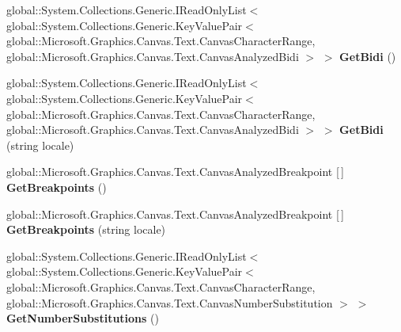 \begin{DoxyCompactItemize}
\mbox{\label{interface_microsoft_1_1_graphics_1_1_canvas_1_1_text_1_1_i_canvas_text_analyzer_ab5391603e9550535647efdab365121e0}} 
global\+::\+System.\+Collections.\+Generic.\+I\+Read\+Only\+List$<$ global\+::\+System.\+Collections.\+Generic.\+Key\+Value\+Pair$<$ global\+::\+Microsoft.\+Graphics.\+Canvas.\+Text.\+Canvas\+Character\+Range, global\+::\+Microsoft.\+Graphics.\+Canvas.\+Text.\+Canvas\+Analyzed\+Bidi $>$ $>$ {\bfseries Get\+Bidi} ()
\item 
\mbox{\label{interface_microsoft_1_1_graphics_1_1_canvas_1_1_text_1_1_i_canvas_text_analyzer_a00b2a6c66d95fcf0eb8cb93429692433}} 
global\+::\+System.\+Collections.\+Generic.\+I\+Read\+Only\+List$<$ global\+::\+System.\+Collections.\+Generic.\+Key\+Value\+Pair$<$ global\+::\+Microsoft.\+Graphics.\+Canvas.\+Text.\+Canvas\+Character\+Range, global\+::\+Microsoft.\+Graphics.\+Canvas.\+Text.\+Canvas\+Analyzed\+Bidi $>$ $>$ {\bfseries Get\+Bidi} (string locale)
\item 
\mbox{\label{interface_microsoft_1_1_graphics_1_1_canvas_1_1_text_1_1_i_canvas_text_analyzer_aae3059f7ac90b34a23ffa7061184bf59}} 
global\+::\+Microsoft.\+Graphics.\+Canvas.\+Text.\+Canvas\+Analyzed\+Breakpoint \mbox{[}$\,$\mbox{]} {\bfseries Get\+Breakpoints} ()
\item 
\mbox{\label{interface_microsoft_1_1_graphics_1_1_canvas_1_1_text_1_1_i_canvas_text_analyzer_aed1856403ffb2ff3f563c0010aeea194}} 
global\+::\+Microsoft.\+Graphics.\+Canvas.\+Text.\+Canvas\+Analyzed\+Breakpoint \mbox{[}$\,$\mbox{]} {\bfseries Get\+Breakpoints} (string locale)
\item 
\mbox{\label{interface_microsoft_1_1_graphics_1_1_canvas_1_1_text_1_1_i_canvas_text_analyzer_a6d7def9fe8d3b06fcfe8ff52672a9ded}} 
global\+::\+System.\+Collections.\+Generic.\+I\+Read\+Only\+List$<$ global\+::\+System.\+Collections.\+Generic.\+Key\+Value\+Pair$<$ global\+::\+Microsoft.\+Graphics.\+Canvas.\+Text.\+Canvas\+Character\+Range, global\+::\+Microsoft.\+Graphics.\+Canvas.\+Text.\+Canvas\+Number\+Substitution $>$ $>$ {\bfseries Get\+Number\+Substitutions} ()

\end{DoxyCompactItemize}
